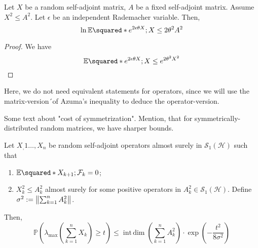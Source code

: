 \begin{lem}[Symmetrization]
    Let \( X \) be a random self-adjoint matrix, \( A  \) be a fixed self-adjoint matrix. Assume \( X^2 \leq A^{2} \). Let \( \epsilon \) be an independent Rademacher variable. Then,
    \[ \operatorname{ln} \mathbb{E}\squared*{e^{2\epsilon \theta X};X} \leq 2 \theta^{2} A^{2}\]
\end{lem}

\begin{proof}
    We have 
    \[ \mathbb{E}\squared*{e^{2\epsilon \theta X};X} \leq e^{2 \theta^{2}X^{2}} \]
\end{proof}

Here, we do not need equivalent statements for operators, since we will use the matrix-version´of Azuma's inequality to deduce the operator-version.

Some text about "cost of symmetrization". Mention, that for symmetrically-distributed random matrices, we have sharper bounds.

\begin{thm}
    Let \( X_,1 \dots, X_n \) be random self-adjoint operators almost surely in \( \mathcal{S}_1(\mathcal{H}) \) such that 
    \begin{enumerate}[1)]
      \item \(\mathbb{E}\squared*{X_{k+1};\mathcal{F}_k} =0\);
      \item \( X_k^{2} \leq A_k^{2} \) almost surely for some positive operators in \( A_k^{2} \in \mathcal{S}_1(\mathcal{H}) \). Define \( \sigma^{2}:= \norm{\sum_{k=1}^{n}A_k^{2}}_{} \).
    \end{enumerate}
    Then,
    \[ \mathbb{P}(\lambda_{\text{max}} (\sum_{k=1}^{n}X_k) \geq t) \leq \operatorname{int\, dim}\left(\sum_{k=1}^{n}A_k^{2}\right) \cdot \operatorname{exp}\left(- \frac{t^2}{8 \sigma^{2}}\right) \]
\end{thm}

